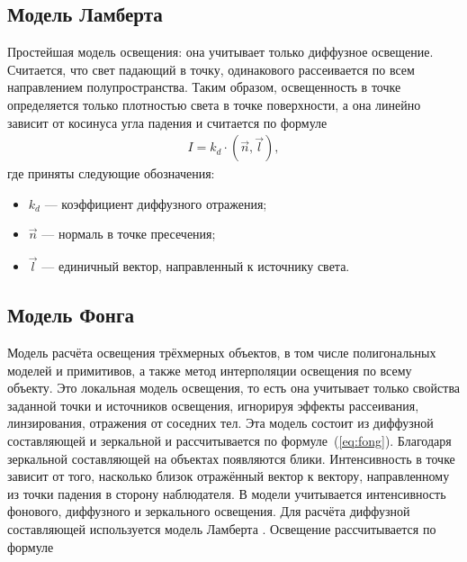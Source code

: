 \subsection{Модель Ламберта}

Простейшая модель освещения: она учитывает только диффузное освещение. Считается, что свет падающий в точку, одинакового рассеивается по всем направлением полупространства. Таким образом, освещенность в точке определяется только плотностью света в точке поверхности, а она линейно зависит от косинуса угла падения и считается по формуле
\begin{equation} \label{eq:lambert}
	\begin{aligned}
		I = k_{d} \cdot (\vec{n}, \vec{l}),
	\end{aligned}
\end{equation}
где приняты следующие обозначения:
\begin{itemize}[label=---]
	\item $k_{d}$ --- коэффициент диффузного отражения;
	\item $\vec{n}$ ---  нормаль в точке пресечения;
	\item $\vec{l}$ --- единичный вектор, направленный к источнику света.
\end{itemize}

\subsection{Модель Фонга}

Модель расчёта освещения трёхмерных объектов, в том числе полигональных моделей и примитивов, а также метод интерполяции освещения по всему объекту. Это локальная модель освещения, то есть она учитывает только свойства заданной точки и источников освещения, игнорируя эффекты рассеивания, линзирования, отражения от соседних тел. Эта модель состоит из диффузной составляющей и зеркальной и рассчитывается по формуле~(\ref{eq:fong}). Благодаря зеркальной составляющей на объектах появляются блики. Интенсивность в точке зависит от того, насколько близок отражённый вектор к вектору, направленному из точки падения в сторону наблюдателя. В модели учитывается интенсивность фонового, диффузного и зеркального освещения. Для расчёта диффузной составляющей используется модель Ламберта \cite{light}. Освещение рассчитывается по формуле

